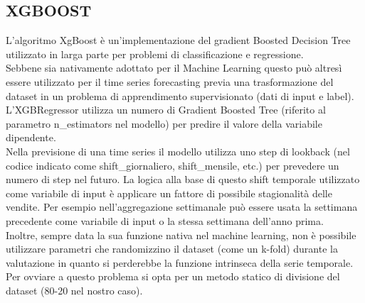 \documentclass[12pt, a4paper, twocolumn]{article} %
\begin{document}
\subsection{XGBOOST}
L'algoritmo XgBoost è un'implementazione del gradient Boosted Decision Tree utilizzato in larga parte per problemi di classificazione e regressione.\\ Sebbene sia nativamente adottato per il Machine Learning questo può altresì essere utilizzato per il time series forecasting previa una trasformazione del dataset in un problema di apprendimento supervisionato (dati di input e label). L'XGBRegressor utilizza un numero di Gradient Boosted Tree (riferito al parametro n\_estimators nel modello) per predire il valore della variabile dipendente.\\
Nella previsione di una time series il modello utilizza uno step di lookback (nel codice indicato come shift\_giornaliero, shift\_mensile, etc.) per prevedere un numero di step nel futuro. La logica alla base di questo shift temporale utilizzato come variabile di input è applicare un fattore di possibile stagionalità delle vendite. Per esempio nell'aggregazione settimanale può essere usata la settimana precedente come variabile di input o la stessa settimana dell'anno prima.\\
Inoltre, sempre data la sua funzione nativa nel machine learning, non è possibile utilizzare parametri che randomizzino il dataset (come un k-fold) durante la valutazione in quanto si perderebbe la funzione intrinseca della serie temporale. Per ovviare a questo problema si opta per un metodo statico di divisione del dataset (80-20 nel nostro caso).\\
\end{document}
